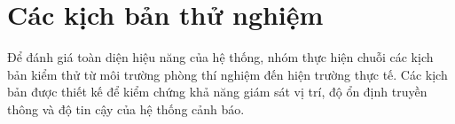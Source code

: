 \section{Các kịch bản thử nghiệm}
Để đánh giá toàn diện hiệu năng của hệ thống, nhóm thực hiện chuỗi các kịch bản kiểm thử từ môi trường phòng thí nghiệm đến hiện trường thực tế. Các kịch bản được thiết kế để kiểm chứng khả năng giám sát vị trí, độ ổn định truyền thông và độ tin cậy của hệ thống cảnh báo.





